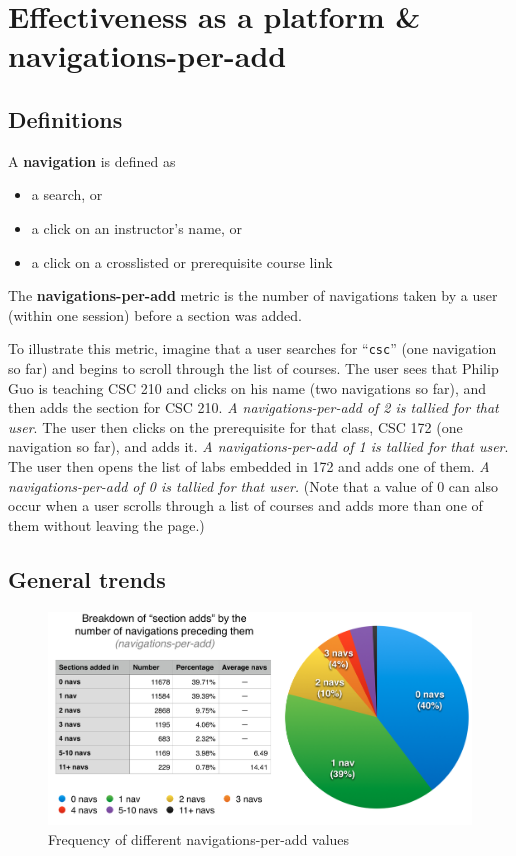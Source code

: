 
\section{Effectiveness as a platform \& navigations-per-add}

\subsection{Definitions}

A \textbf{navigation} is defined as

\onehalfspacing
\begin{itemize}
  \item a search, or
  \item a click on an instructor’s name, or
  \item a click on a crosslisted or prerequisite course link
\end{itemize}
\doublespacing

\noindent The \textbf{navigations-per-add} metric is the number of navigations taken by a user (within one session) before a section was added. 

To illustrate this metric, imagine that a user searches for ``{\tt csc}'' (one navigation so far) and begins to scroll through the list of courses. The user sees that Philip Guo is teaching CSC 210 and clicks on his name (two navigations so far), and then adds the section for CSC 210. \emph{A navigations-per-add of 2 is tallied for that user}. The user then clicks on the prerequisite for that class, CSC 172 (one navigation so far), and adds it. \emph{A navigations-per-add of 1 is tallied for that user}. The user then opens the list of labs embedded in 172 and adds one of them. \emph{A navigations-per-add of 0 is tallied for that user.} (Note that a value of 0 can also occur when a user scrolls through a list of courses and adds more than one of them without leaving the page.)

\subsection{General trends}

\begin{figure}
  \centering
  \includegraphics[width=1.0\textwidth]{images/graph/combined_navs}

  \caption{Frequency of different navigations-per-add values}
  \label{fig:navs-combined}
\end{figure}

